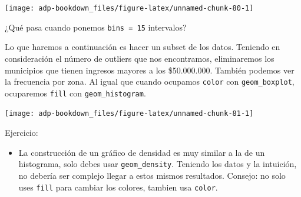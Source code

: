 \documentclass[]{book}
\newenvironment{Shaded}{\begin{snugshade}}{\end{snugshade}}
\newcommand{\DataTypeTok}[1]{\textcolor[rgb]{0.13,0.29,0.53}{#1}}
\newcommand{\DecValTok}[1]{\textcolor[rgb]{0.00,0.00,0.81}{#1}}
\newcommand{\FloatTok}[1]{\textcolor[rgb]{0.00,0.00,0.81}{#1}}
\newcommand{\KeywordTok}[1]{\textcolor[rgb]{0.13,0.29,0.53}{\textbf{#1}}}
\newcommand{\NormalTok}[1]{#1}
\newcommand{\OperatorTok}[1]{\textcolor[rgb]{0.81,0.36,0.00}{\textbf{#1}}}
\newcommand{\StringTok}[1]{\textcolor[rgb]{0.31,0.60,0.02}{#1}}
\providecommand{\tightlist}{%
  \setlength{\itemsep}{0pt}\setlength{\parskip}{0pt}}
\begin{document}
\begin{center}\texttt{[image: adp-bookdown\_files/figure-latex/unnamed-chunk-80-1]} \end{center}

¿Qué pasa cuando ponemos \texttt{bins\ =\ 15} intervalos?

Lo que haremos a continuación es hacer un subset de los datos. Teniendo
en consideración el número de outliers que nos encontramos, eliminaremos
los municipios que tienen ingresos mayores a los \$50.000.000. También
podemos ver la frecuencia por zona. Al igual que cuando ocupamos
\texttt{color} con \texttt{geom\_boxplot}, ocuparemos \texttt{fill} con
\texttt{geom\_histogram}.

\begin{Shaded}
\end{Shaded}

\begin{center}\texttt{[image: adp-bookdown\_files/figure-latex/unnamed-chunk-81-1]} \end{center}

Ejercicio:

\begin{itemize}
\tightlist
\item
  La construcción de un gráfico de densidad es muy similar a la de un
  histograma, solo debes usar \texttt{geom\_density}. Teniendo los datos
  y la intuición, no debería ser complejo llegar a estos mismos
  resultados. Consejo: no solo uses \texttt{fill} para cambiar los
  colores, tambien usa \texttt{color}.
\end{itemize}
\end{document}
